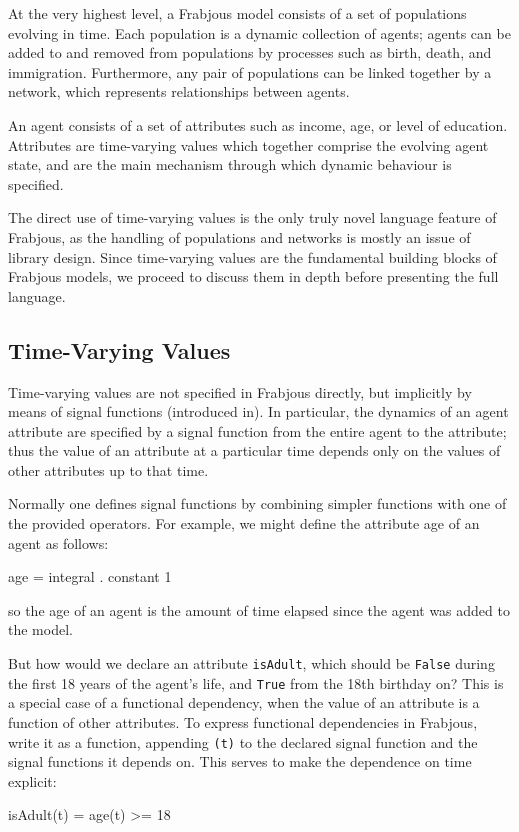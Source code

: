 \documentclass{article}
\begin{document}
At the very highest level, a Frabjous model consists of a set of populations evolving in time. Each population is a dynamic collection of agents; agents can be added to and removed from populations by processes such as birth, death, and immigration. Furthermore, any pair of populations can be linked together by a network, which represents relationships between agents.

An agent consists of a set of attributes such as income, age, or level of education. Attributes are time-varying values which together comprise the evolving agent state, and are the main mechanism through which dynamic behaviour is specified. 

The direct use of time-varying values is the only truly novel language feature of Frabjous, as the handling of populations and networks is mostly an issue of library design. Since time-varying values are the fundamental building blocks of Frabjous models, we proceed to discuss them in depth before presenting the full language. 

\subsection{Time-Varying Values}

Time-varying values are not specified in Frabjous directly, but implicitly by means of signal functions (introduced in). In particular, the dynamics of an agent attribute are specified by a signal function from the entire agent to the attribute; thus the value of an attribute at a particular time depends only on the values of other attributes up to that time. 

   Normally one defines signal functions by combining simpler functions with one of the provided operators. For example, we might define the attribute age of an agent as follows: 
\begin{code}
 age = integral . constant 1
\end{code}
so the age of an agent is the amount of time elapsed since the agent was added to the model.

   But how would we declare an attribute \lstinline{isAdult}, which should be  \lstinline{False} during the first 18 years of the agent's life, and  \lstinline{True} from the 18th birthday on? This is a special case of a functional dependency, when the value of an attribute is a function of other attributes.  To express functional dependencies in Frabjous, write it as a function, appending \lstinline{(t)} to the declared signal function and the signal functions it depends on. This serves to make the dependence on time explicit: 
\begin{code}
 isAdult(t) = age(t) >= 18
\end{code}
\end{document}
